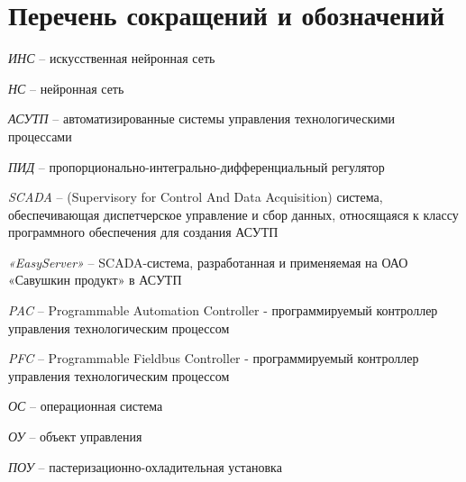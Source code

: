 \chapter*{Перечень сокращений и обозначений}

\textit{ИНС} -- искусственная нейронная сеть

\textit{НС} -- нейронная сеть

\textit{АСУТП} -- автоматизированные системы управления технологическими процессами

\textit{ПИД} -- пропорционально-интегрально-дифференциальный регулятор

\textit{SCADA} -- (Supervisory for Control And Data Acquisition) система, обеспечивающая диспетчерское управление и сбор данных, относящаяся к классу программного обеспечения для создания АСУТП

\textit{«EasyServer»} -- SCADA-система, разработанная и применяемая на ОАО «Савушкин продукт» в АСУТП

\textit{PAC} -- Programmable Automation Controller - программируемый контроллер управления технологическим процессом

\textit{PFC} -- Programmable Fieldbus Controller - программируемый контроллер управления технологическим процессом

\textit{ОС} -- операционная система

\textit{ОУ} -- объект управления

\textit{ПОУ} -- пастеризационно-охладительная установка
